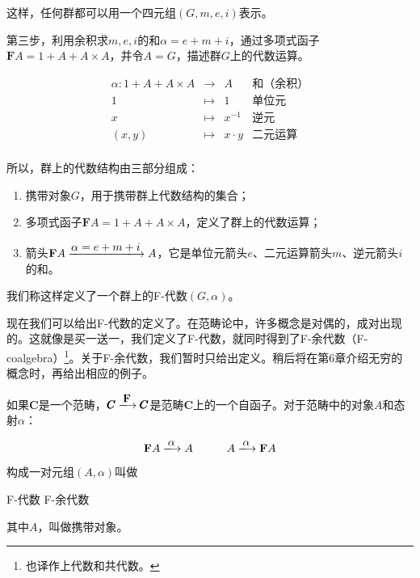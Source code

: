 \documentclass{article}
\begin{document}
\begin{example}
这样，任何群都可以用一个四元组$(G, m, e, i)$表示。

第三步，利用余积求$m, e, i$的和$\alpha = e + m + i$，通过多项式函子$\mathbf{F} A = 1 + A + A \times A$，并令$A = G$，描述群$G$上的代数运算。

\[
\begin{array}{rcll}
\alpha : 1 + A + A \times A & \longrightarrow & A & \text{和（余积）}\\
1 & \longmapsto & 1 & \text{单位元}  \\
x & \longmapsto & x^{-1} & \text{逆元} \\
(x, y) & \longmapsto & x \cdot y & \text{二元运算} \\
\end{array}
\]

所以，群上的代数结构由三部分组成：

\begin{enumerate}
  \item 携带对象$G$，用于携带群上代数结构的集合；
  \item 多项式函子$\mathbf{F} A = 1 + A + A \times A$，定义了群上的代数运算；
  \item 箭头$\mathbf{F} A \arrowto{\alpha = e + m + i} A$，它是单位元箭头$e$、二元运算箭头$m$、逆元箭头$i$的和。
\end{enumerate}

我们称这样定义了一个群上的F-代数$(G, \alpha)$。
\end{example}

现在我们可以给出F-代数的定义了。在范畴论中，许多概念是对偶的，成对出现的。这就像是买一送一，我们定义了F-代数，就同时得到了F-余代数（F-coalgebra）\footnote{也译作上代数和共代数。}。关于F-余代数，我们暂时只给出定义。稍后将在第6章介绍无穷的概念时，再给出相应的例子。

\begin{definition}
如果$\pmb{C}$是一个范畴，$\pmb{C} \arrowto{\mathbf{F}} \pmb{C}$是范畴$\pmb{C}$上的一个自函子。对于范畴中的对象$A$和态射$\alpha$：

\[
  \mathbf{F} A \arrowto{\alpha} A
  \quad \quad \quad
  A \arrowto{\alpha} \mathbf{F} A
\]

构成一对元组$(A, \alpha)$叫做

\begin{center}
  F-代数 \quad \quad \quad F-余代数
\end{center}

其中$A$，叫做携带对象。

\end{definition}
\end{document}
